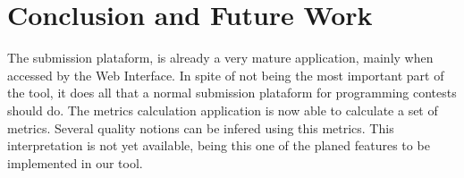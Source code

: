 \section{Conclusion and Future Work}\label{conc}
The submission plataform, is already a very mature application, mainly when accessed by the Web Interface.
In spite of not being the most important part of the tool, it does all that a normal submission
plataform for programming contests should do.
The metrics calculation application is now able to calculate a set of metrics. Several quality notions can be infered using this metrics.
This interpretation is not yet available, being this one of the planed features to be implemented in our tool.

